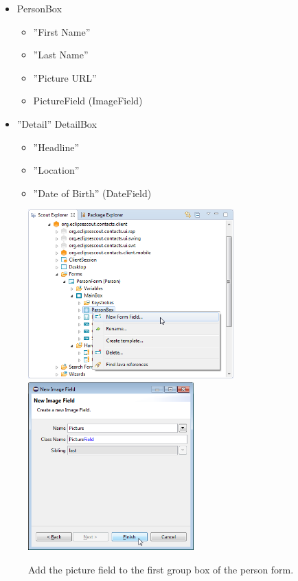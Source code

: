 \documentclass[a4paper,10pt,twoside]{book}
\begin{document}
\begin{itemize}
  \item{PersonBox}
  \begin{itemize}
    \item ''First Name'' 
    \item ''Last Name''
    \item ''Picture URL''
    \item PictureField (ImageField)
  \end{itemize} 
  \item{''Detail'' DetailBox}
  \begin{itemize}
    \item ''Headline'' 
    \item ''Location''
    \item ''Date of Birth'' (DateField)
  \end{itemize} 
\end{itemize} 

\begin{figure}
\includegraphics[height=6.5cm]{new_field_picture_contextmenu.png} \hspace{5mm}
\includegraphics[height=6.5cm]{new_field_picture.png}
\caption{Add the picture field to the first group box of the person form.}
\end{figure}
\end{document}
